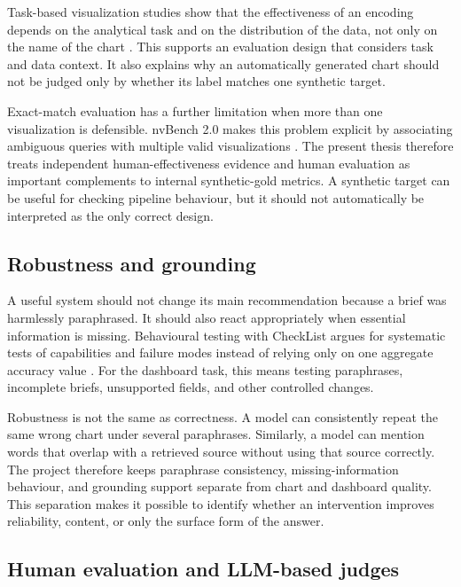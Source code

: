 Task-based visualization studies show that the effectiveness of an encoding depends on the analytical task and on the distribution of the data, not only on the name of the chart \cite{saket2019taskbased,kim2018taskdata}. This supports an evaluation design that considers task and data context. It also explains why an automatically generated chart should not be judged only by whether its label matches one synthetic target.

Exact-match evaluation has a further limitation when more than one visualization is defensible. nvBench 2.0 makes this problem explicit by associating ambiguous queries with multiple valid visualizations \cite{luo2025nvbench2}. The present thesis therefore treats independent human-effectiveness evidence and human evaluation as important complements to internal synthetic-gold metrics. A synthetic target can be useful for checking pipeline behaviour, but it should not automatically be interpreted as the only correct design.

\subsection{Robustness and grounding}

A useful system should not change its main recommendation because a brief was harmlessly paraphrased. It should also react appropriately when essential information is missing. Behavioural testing with CheckList argues for systematic tests of capabilities and failure modes instead of relying only on one aggregate accuracy value \cite{ribeiro2020checklist}. For the dashboard task, this means testing paraphrases, incomplete briefs, unsupported fields, and other controlled changes.

Robustness is not the same as correctness. A model can consistently repeat the same wrong chart under several paraphrases. Similarly, a model can mention words that overlap with a retrieved source without using that source correctly. The project therefore keeps paraphrase consistency, missing-information behaviour, and grounding support separate from chart and dashboard quality. This separation makes it possible to identify whether an intervention improves reliability, content, or only the surface form of the answer.

\subsection{Human evaluation and LLM-based judges}

